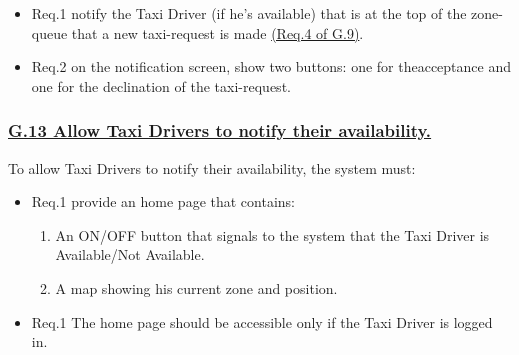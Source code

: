 				\begin{itemize}
					\item \lbrack Req.1\rbrack \label{sec:fr1_g12} notify the Taxi Driver (if he's available) that is at the top of the zone-queue that a new taxi-request is made \hyperref[sec:fr4_g9]{(Req.4 of G.9)}.
					\item \lbrack Req.2\rbrack \label{sec:fr2_g12} on the notification screen, show two buttons: one for theacceptance and one for the declination of the taxi-request.
				\end{itemize}


			\subsubsection{\lbrack \hyperref[sec:g13]{G.13 Allow Taxi Drivers to notify their availability.}\rbrack}\label{sec:frs13}
			To allow Taxi Drivers to notify their availability, the system must:
				\begin{itemize}
					\item \lbrack Req.1\rbrack \label{sec:fr1_g13} provide an home page that contains:
						\begin{enumerate}
							\item An ON/OFF button that signals to the system that the Taxi Driver is Available/Not Available.
							\item A map showing his current zone and position.
						\end{enumerate}
					\item \lbrack Req.1\rbrack \label{sec:fr1_g13} The home page should be accessible only if the Taxi Driver is logged in.
				\end{itemize}